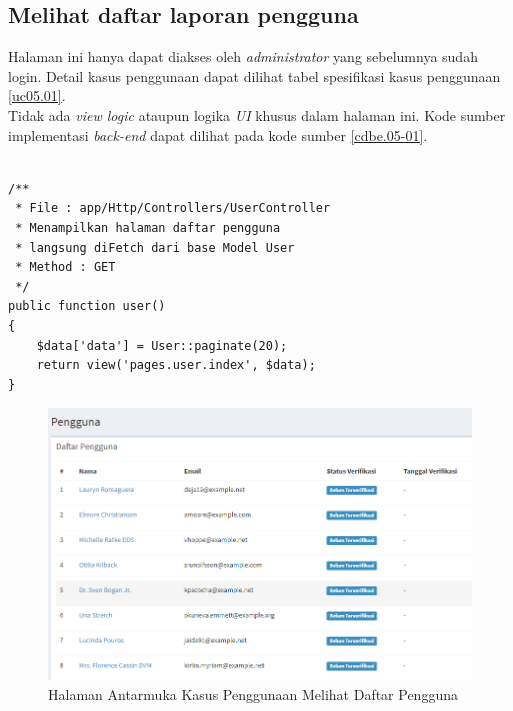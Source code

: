 \subsection{Melihat daftar laporan pengguna}
Halaman ini hanya dapat diakses oleh \textit{administrator} yang sebelumnya sudah login. Detail kasus penggunaan dapat dilihat tabel spesifikasi kasus penggunaan \ref{uc05.01}.\\
\indent Tidak ada \textit{view logic} ataupun logika \textit{UI} khusus dalam halaman ini. Kode sumber implementasi \textit{back-end} dapat dilihat pada kode sumber \ref{cdbe.05-01}.

\begin{lstlisting}[label=cdbe.05-01,style=php,caption=Kode Sumber Antarmuka Registrasi]

/** 
 * File : app/Http/Controllers/UserController
 * Menampilkan halaman daftar pengguna
 * langsung diFetch dari base Model User
 * Method : GET
 */
public function user()
{
    $data['data'] = User::paginate(20);
    return view('pages.user.index', $data);
}
\end{lstlisting}
      
  \begin{figure}[H]
    \centering
    \includegraphics[width=\textwidth]{images/bab4/ui/05-01.png}
    \caption{Halaman Antarmuka Kasus Penggunaan Melihat Daftar Pengguna}
    \label{ui.05-01}
  \end{figure}
      
